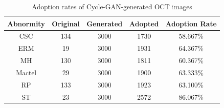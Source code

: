 \documentclass{article}
\begin{document}
	{
		\fontsize{9}{12}\selectfont
		{
			\begin{longtable}{ccccc}
				\caption{Adoption rates of Cycle-GAN-generated OCT images}
				\label{tb:cycleGAN_number}\\
				\toprule
				Abnormity&Original&Generated&Adopted&Adoption Rate\\
				\midrule
				CSC   &134&3000&1730&58.667\% \\
				ERM   &19 &3000&1931&64.367\% \\
				MH    &130&3000&1811&60.367\% \\
				Mactel&29 &3000&1900&63.333\% \\
				RP    &133&3000&1923&63.100\% \\
				ST    &23 &3000&2572&86.067\% \\
				\bottomrule
			\end{longtable}
		}
	}
	
\end{document}
